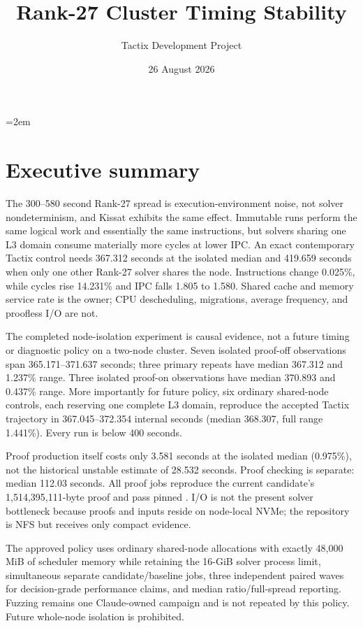 \documentclass[11pt]{article}
\title{Rank-27 Cluster Timing Stability}
\author{Tactix Development Project}
\date{26 August 2026}
\newcommand{\code}[1]{\texttt{\detokenize{#1}}}
\begin{document}
\emergencystretch=2em
\maketitle

\section*{Executive summary}
The 300--580 second Rank-27 spread is execution-environment noise, not solver
nondeterminism, and Kissat exhibits the same effect.  Immutable runs perform
the same logical work and essentially the same instructions, but solvers
sharing one L3 domain consume materially more cycles at lower IPC.  An exact
contemporary Tactix control needs 367.312 seconds at
the isolated median and 419.659 seconds when only one other Rank-27 solver
shares the node.  Instructions change 0.025\%, while cycles rise 14.231\% and
IPC falls 1.805 to 1.580.  Shared cache and memory service rate is the owner;
CPU descheduling, migrations, average frequency, and proofless I/O are not.

The completed node-isolation experiment is causal evidence, not a future
timing or diagnostic policy on a two-node cluster.  Seven isolated proof-off
observations span 365.171--371.637
seconds; three primary repeats have median 367.312 and 1.237\% range.  Three
isolated proof-on observations have median 370.893 and 0.437\% range.  More
importantly for future policy, six ordinary shared-node
\code{-c 12} controls, each reserving one complete L3 domain, reproduce the
accepted Tactix trajectory in 367.045--372.354 internal seconds (median
368.307, full range 1.441\%).  Every run is below 400 seconds.

Proof production itself costs only 3.581 seconds at the isolated median
(0.975\%), not the historical unstable estimate of 28.532 seconds.  Proof
checking is separate: median 112.03 seconds.  All proof jobs reproduce the
current candidate's 1,514,395,111-byte proof and pass pinned \code{drat-trim}.
I/O is not the present solver bottleneck because proofs and inputs reside on
node-local NVMe; the repository is NFS but receives only compact evidence.

The approved policy uses ordinary shared-node \code{-c 12} allocations with
exactly 48,000 MiB of scheduler memory while retaining the 16-GiB solver
process limit, simultaneous separate candidate/baseline jobs, three independent paired waves
for decision-grade performance claims, and median ratio/full-spread reporting.
Fuzzing remains one Claude-owned campaign and is not repeated by this policy.
Future whole-node isolation is prohibited.
\end{document}
